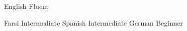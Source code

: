 
\begin{cvskills}

  \cvskill
    {English} %
    {Fluent} %

  \cvskill
    {Farsi} %
    {Intermediate} %
  \cvskill
    {Spanish} %
    {Intermediate} %
  \cvskill
    {German} %
    {Beginner} %

\end{cvskills}
